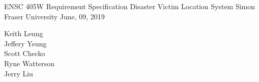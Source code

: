 \documentclass[11pt]{article}
\begin{document}
\thispagestyle{empty}
	
\begin{titlepage}
\null\vfill

\begin{center}

	{\Huge ENSC 405W }
	\vskip 1cm
	{\Huge Requirement Specification }
	\vskip 1cm 
	{\Huge Disaster Victim Location System }
	\vskip 1cm
	{\LARGE Simon Fraser University}
	\vskip 0.5cm
	{\LARGE June, 09, 2019}
	\end{center}
	  
	\vfill
	\vfill
	\vfill
	 
	\begin{flushright}
	Keith Leung\\
	Jeffery Yeung\\
	Scott Checko\\
	Ryne Watterson\\
	Jerry Liu\\
	\end{flushright}

\end{titlepage}
\end{document}
